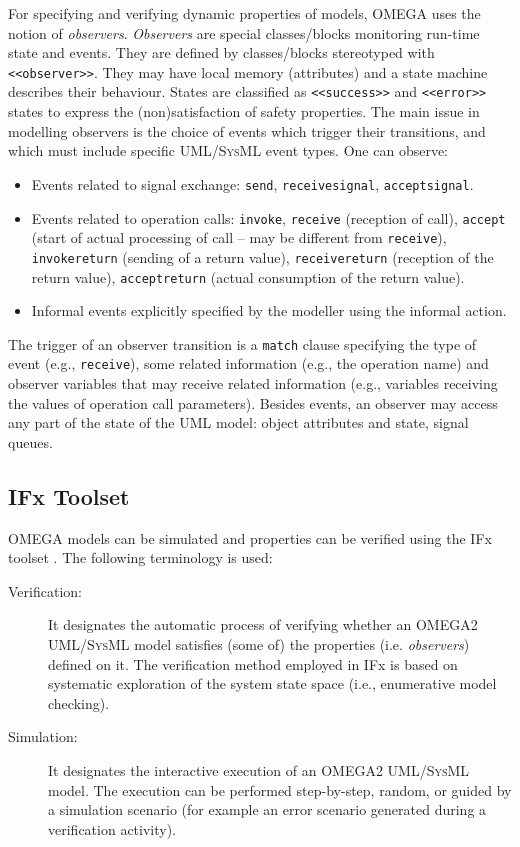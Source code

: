 \documentclass[a4paper,twoside]{article}
\def\sysml{\textsc{SysML}}
\def\uml{\textsc{UML}}
\begin{document}
For specifying and verifying dynamic properties of models, OMEGA uses the notion of \textit{observers}. \textit{Observers} are special classes/blocks monitoring run-time state and events. They are defined by classes/blocks stereotyped with \texttt{<<observer>>}. They may have local memory (attributes) and a state machine describes their behaviour. States are classified as \texttt{<<success>>} and \texttt{<<error>>} states to express the (non)satisfaction of safety properties. The main issue in modelling observers is the choice of events which trigger their transitions, and which must include specific \uml{}/\sysml{} event types. One can observe:
\begin{itemize}
\item Events related to signal exchange: \texttt{send}, \texttt{receivesignal}, \texttt{acceptsignal}.
\item Events related to operation calls: \texttt{invoke}, \texttt{receive} (reception of call), \texttt{accept} (start of actual processing of call -- may be different from \texttt{receive}), \texttt{invokereturn} (sending of a 
return 	value), \texttt{receivereturn} (reception of the return value), \texttt{acceptreturn} (actual consumption of the return value).
\item Informal events explicitly specified by the modeller using the informal action.
\end{itemize}
The trigger of an observer transition is a \texttt{match} clause specifying the type of event (e.g., \texttt{receive}), some related information (e.g., the operation name) and observer variables that may receive related information (e.g., variables receiving the values of operation call parameters). Besides events, an observer may access any part of the state of the \uml{} model: object attributes and state, signal queues. 

\subsection{IFx Toolset}

\noindent OMEGA models can be simulated and properties can be verified using the IFx toolset \cite{BozgaGOOS04}. The following terminology is used: 

\begin{description}
\item[Verification:] It designates  the  automatic  process  of  verifying  whether  an  OMEGA2  \uml{}/\sysml{} model  satisfies  (some  of)  the  properties  (i.e. \textit{observers})  defined  on  it.  The  verification  method employed in IFx is based on systematic exploration of the system state space (i.e., enumerative model checking). 
\item[Simulation:] It designates  the  interactive  execution  of  an  OMEGA2  \uml{}/\sysml{}  model.  The execution  can    be  performed  step-by-step,  random,  or  guided  by  a  simulation  scenario  (for example an error scenario generated during a verification activity). 
\end{description}
\end{document}
